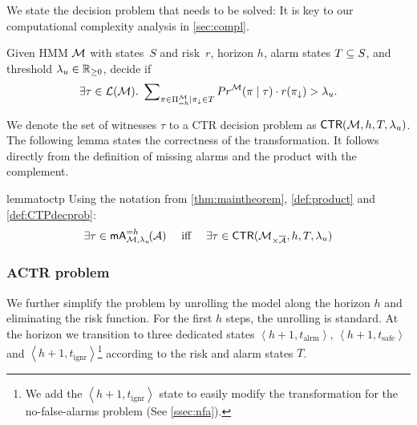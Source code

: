 \documentclass[runningheads]{llncs}
\newcommand{\talrm}{t_{\text{alrm}}}
\newcommand{\tsafe}{t_{\text{safe}}}
\newcommand{\tig}{t_{\text{ignr}}}
\newcommand{\alarms}[1][h+1]{\left\langle #1, \talrm\right\rangle}
\newcommand{\safes}[1][h+1]{\left\langle #1, \tsafe\right\rangle}
\newcommand{\igs}[1][h+1]{\left\langle #1, \tig\right\rangle}
\newcommand{\missedalarms}[2]{\mathsf{mA}_{#1}^{#2}}
\begin{document}
We state the decision problem that needs to be solved: It is key to our computational complexity analysis in \cref{sec:compl}.
\begin{definition}
    \label{def:CTPdecprob}
    Given HMM $\mathcal{M}$ with states~$S$ and risk~$r$, horizon $h$, alarm states $T\subseteq S$, and threshold $\lambda_u \in \mathbb{R}_{\geq 0}$, decide if \[\exists \tau \in \mathcal{L}(\mathcal{M}).~ \sum\nolimits_{\pi\in\Pi^{\mathcal{M}}_{=h}\mid\pi_\downarrow \in T}{Pr}^{\mathcal{M}}(\pi \mid \tau) \cdot r(\pi_\downarrow) > \lambda_u.\]
\end{definition}
We denote the set of witnesses $\tau$ to a CTR decision problem as $\mathsf{CTR}(\mathcal{M}, h, T, \lambda_u)$.
The following lemma states the correctness of the transformation. It follows directly from the definition of missing alarms and the product with the complement.
\begin{restatable}{lemma}{toctp}
    \label{lem:toctp}
    Using the notation from \cref{thm:maintheorem}, \cref{def:product} and \cref{def:CTPdecprob}:
    \[ \exists \tau \in \missedalarms{\mc,\lambda_u}{= h}\!(\dfa) \quad\text{ iff }\quad \exists \tau \in \mathsf{CTR}(\mc_{\times\overline{\dfa}}, h, T, \lambda_u)\]
\end{restatable}

%

%


\subsubsection{ACTR problem}
We further simplify the problem by unrolling the model along the horizon $h$ and eliminating the risk function.
For the first $h$ steps, the unrolling is standard. At the horizon we transition to three dedicated states $\alarms$, $\safes$ and $\igs$\footnote{We add the $\igs$ state to easily modify the transformation for the no-false-alarms problem (See \cref{ssec:nfa}).} according to the risk and alarm states $T$.
\end{document}
